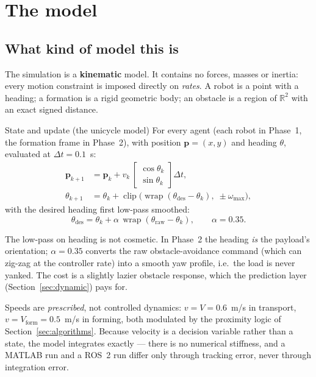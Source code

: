 \section{The model}
\label{sec:model-kinematics}

\subsection{What kind of model this is}

The simulation is a \textbf{kinematic} model. It contains no forces, masses or
inertia: every motion constraint is imposed directly on \emph{rates}. A robot
is a point with a heading; a formation is a rigid geometric body; an obstacle
is a region of $\mathbb{R}^2$ with an exact signed distance.

\begin{keybox}{State and update (the unicycle model)}
For every agent (each robot in Phase~1, the formation frame in Phase~2), with
position $\mathbf{p} = (x, y)$ and heading $\theta$, evaluated at
$\Delta t = 0.1$~s:
\begin{align}
\mathbf{p}_{k+1} &= \mathbf{p}_k + v_k \, \begin{bmatrix}\cos\theta_k \\ \sin\theta_k\end{bmatrix} \Delta t, \\[4pt]
\theta_{k+1} &= \theta_k + \operatorname{clip}\bigl(\operatorname{wrap}(\theta_{\mathrm{des}} - \theta_k),\; \pm\omega_{\max}\bigr),
\end{align}
with the desired heading first low-pass smoothed:
\[
\theta_{\mathrm{des}} = \theta_k + \alpha\,\operatorname{wrap}(\theta_{\mathrm{raw}} - \theta_k),
\qquad \alpha = 0.35 .
\]
\end{keybox}

The low-pass on heading is not cosmetic. In Phase~2 the heading \emph{is} the
payload's orientation; $\alpha = 0.35$ converts the raw obstacle-avoidance
command (which can zig-zag at the controller rate) into a smooth yaw profile,
i.e.\ the load is never yanked. The cost is a slightly lazier obstacle
response, which the prediction layer (Section~\ref{sec:dynamic}) pays for.

Speeds are \emph{prescribed}, not controlled dynamics:
$v = V = 0.6$~m/s in transport, $v = V_{\mathrm{form}} = 0.5$~m/s in forming,
both modulated by the proximity logic of Section~\ref{sec:algorithms}.
Because velocity is a decision variable rather than a state, the model
integrates exactly --- there is no numerical stiffness, and a MATLAB run and a
ROS~2 run differ only through tracking error, never through integration error.


